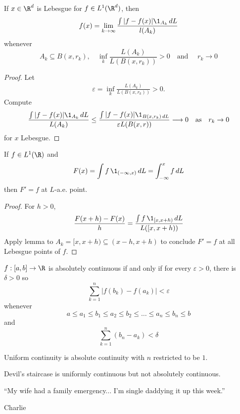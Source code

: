 \begin{lemma}
	If $x \in \R^d$ is Lebesgue for $f \in L^1 (\R^d)$, then
	\[
		f(x) = \lim_{k \to \infty}  \frac{\int | f - f(x) |\1_{A_k} \, dL}{l(A_{k})}
	\] whenever
	\[
		A_k \subseteq B(x,r_{k}), \quad \inf_{k} \frac{L(A_k)}{L(B(x,r_k))} > 0 \quad \text{and }\quad r_k \to 0
	\]
\end{lemma}

\begin{proof}
	Let
	\begin{align*}
		\varepsilon = \inf_{k} \frac{L(A_k)}{L(B(x,r_k))} > 0.
	\end{align*} Compute
	\begin{align*}
		\frac{\int | f - f(x) | \1_{A_k} \, dL}{L(A_k)} \leq \frac{\int |f - f(x) | \1_{B(x,r_k) \, dL}}{\varepsilon L(B(x,r))}
		\longrightarrow 0 \quad \text{as} \quad r_k \to 0
	\end{align*}
	for $x$ Lebesgue.
\end{proof}

\begin{corollary}
	If $f \in L^1(\R)$ and
	\[
		F(x) = \int f \, \1_{(-\infty, x)} \, dL = \int_{-\infty}^{x} f \, dL
	\] then
	$F' = f$ at $L$-a.e. point.
\end{corollary}

\begin{proof}
	For $h > 0$,
	\[
		\frac{F(x +h) - F(x)}{h} = \frac{\int f \, \1_{[x,x+h)} \, dL}{L([x,x+h))}
	\]
	Apply lemma to $A_k = [x, x+h) \subseteq (x-h, x+h)$ to conclude $F' = f$ at all Lebesgue points of $f$.
\end{proof}


\begin{definition}
	$f: [a,b] \to \R$ is absolutely continuous if and only if for every $\varepsilon > 0$, there is $\delta > 0$ so
	\[
		\sum_{k=1}^n |f(b_{k}) - f(a_k) | < \varepsilon
	\]whenever
	\[
		a \leq a_1 \leq b_1 \leq a_2 \leq b_2 \leq \ldots \leq a_n \leq b_n \leq b
	\] and
	\[
		\sum_{k=1}^n (b_n - a_k) < \delta
	\]
\end{definition}

\begin{remark}
	Uniform continuity is absolute continuity with $n$ restricted to be $1$.
\end{remark}

\begin{example}
	Devil's staircase is uniformly continuous but not absolutely continuous.
\end{example}

\epigraph{``My wife had a family emergency... I'm single daddying it up this week.''}{Charlie}

